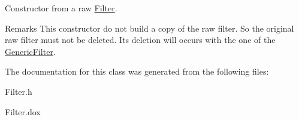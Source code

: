 Constructor from a raw \mbox{\hyperlink{classHurricane_1_1Filter}{Filter}}.

\begin{DoxyRemark}{Remarks}
This constructor do not build a copy of the raw filter. So the original raw filter must not be deleted. It\textquotesingle{}s deletion will occurs with the one of the \mbox{\hyperlink{classHurricane_1_1GenericFilter}{Generic\+Filter}}. 
\end{DoxyRemark}


The documentation for this class was generated from the following files\+:\begin{DoxyCompactItemize}
\item 
Filter.\+h\item 
Filter.\+dox\end{DoxyCompactItemize}
